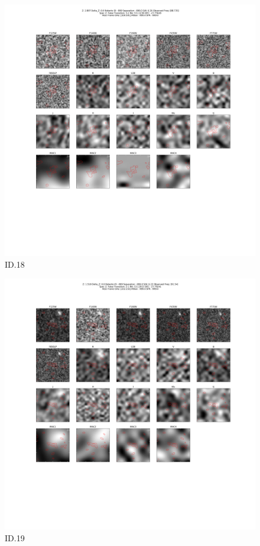 \begin{figure}[tbp]
\centering \includegraphics[width=120mm]{Matched/ASPECS_Cutout_18.png}
\caption{ID.18}
\label{fig:Match_Three}
\end{figure}

\begin{figure}[tbp]
\centering \includegraphics[width=120mm]{Matched/ASPECS_Cutout_19.png}
\caption{ID.19}
\label{fig:Match_Three}
\end{figure}

